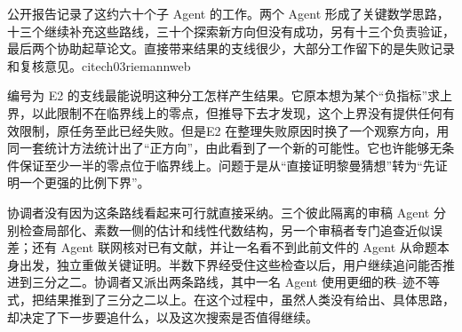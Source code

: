 公开报告记录了这约六十个子 Agent 的工作。两个 Agent 形成了关键数学思路，十三个继续补充这些路线，三十个探索新方向但没有成功，另有十三个负责验证，最后两个协助起草论文。直接带来结果的支线很少，大部分工作留下的是失败记录和复核意见。cite{ch03riemannweb}

编号为 E2 的支线最能说明这种分工怎样产生结果。它原本想为某个“负指标”求上界，以此限制不在临界线上的零点，但推导下去才发现，这个上界没有提供任何有效限制，原任务至此已经失败。但是E2 在整理失败原因时换了一个观察方向，用同一套统计方法统计出了“正方向”，由此看到了一个新的可能性。它也许能够无条件保证至少一半的零点位于临界线上。问题于是从“直接证明黎曼猜想”转为“先证明一个更强的比例下界”。\cite{ch03riemannpaper,ch03riemanntranscript}

协调者没有因为这条路线看起来可行就直接采纳。三个彼此隔离的审稿 Agent 分别检查局部化、素数一侧的估计和线性代数结构，另一个审稿者专门追查近似误差；还有 Agent 联网核对已有文献，并让一名看不到此前文件的 Agent 从命题本身出发，独立重做关键证明。半数下界经受住这些检查以后，用户继续追问能否推进到三分之二。协调者又派出两条路线，其中一名 Agent 使用更细的秩--迹不等式，把结果推到了三分之二以上。在这个过程中，虽然人类没有给出、具体思路，却决定了下一步要追什么，以及这次搜索是否值得继续。\cite{ch03riemannpaper,ch03riemanntranscript}

